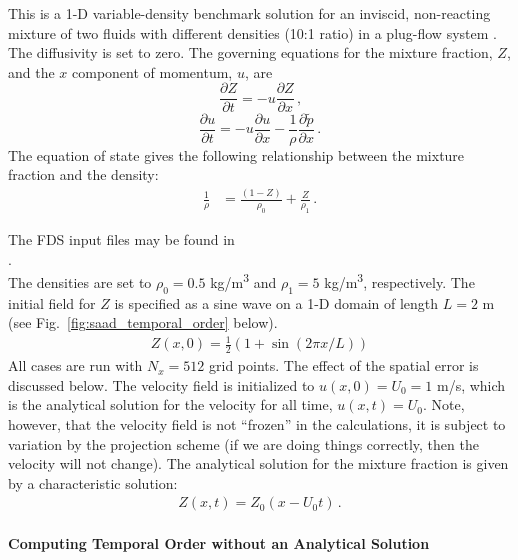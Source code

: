 \documentclass[11pt]{book}
\begin{document}
\noindent This is a 1-D variable-density benchmark solution for an inviscid, non-reacting mixture of two fluids with different densities (10:1 ratio) in a plug-flow system \cite{Biglari:2013}.  The diffusivity is set to zero.  The governing equations for the mixture fraction, $Z$, and the $x$ component of momentum, $u$, are
\begin{equation}
\frac{\partial Z}{\partial t} = - u\frac{\partial Z}{\partial x} \,\mbox{,}
\end{equation}
\begin{equation}
\frac{\partial u}{\partial t} = - u\frac{\partial u}{\partial x} - \frac{1}{\rho} \frac{\partial \tilde{p}}{\partial x} \,\mbox{.}
\end{equation}
The equation of state gives the following relationship between the mixture fraction and the density:
\begin{align}
\frac{1}{\rho} &= \frac{(1-Z)}{\rho_0} + \frac{Z}{\rho_1} \,\mbox{.}
\end{align}

The FDS input files may be found in\\
.\\

\noindent The densities are set to $\rho_0 = 0.5$ \unit{kg/m^3} and $\rho_1 = 5$ \unit{kg/m^3}, respectively.  The initial field for $Z$ is specified as a sine wave on a 1-D domain of length $L=2$ m (see Fig.~\ref{fig:saad_temporal_order} below).
\begin{align}
Z(x,0) = \frac{1}{2}\left( 1 + \sin(2\pi x/L) \right)
\end{align}
All cases are run with $N_x = 512$ grid points.  The effect of the spatial error is discussed below. The velocity field is initialized to $u(x,0) = U_0 = 1$ m/s, which is the analytical solution for the velocity for all time, $u(x,t) = U_0$.  Note, however, that the velocity field is not ``frozen'' in the calculations, it is subject to variation by the projection scheme (if we are doing things correctly, then the velocity will not change).  The analytical solution for the mixture fraction is given by a characteristic solution:
\begin{align}
Z(x,t) = Z_0(x-U_0 t) \,\mbox{.}
\end{align}

\paragraph{Computing Temporal Order without an Analytical Solution}
\end{document}

